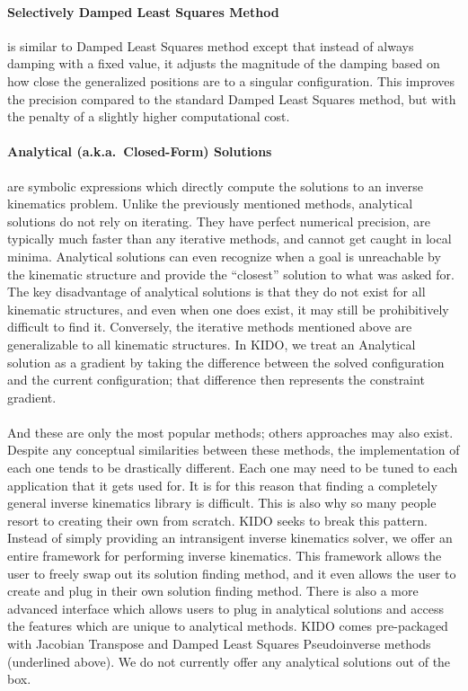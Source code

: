 \paragraph{Selectively Damped Least Squares Method\cite{Buss2005sdls}} is similar to Damped Least Squares method except that instead of always damping with a fixed value, it adjusts the magnitude of the damping based on how close the generalized positions are to a singular configuration. This improves the precision compared to the standard Damped Least Squares method, but with the penalty of a slightly higher computational cost.

\paragraph{Analytical (a.k.a.\ Closed-Form) Solutions} are symbolic expressions which directly compute the solutions to an inverse kinematics problem. Unlike the previously mentioned methods, analytical solutions do not rely on iterating. They have perfect numerical precision, are typically much faster than any iterative methods, and cannot get caught in local minima. Analytical solutions can even recognize when a goal is unreachable by the kinematic structure and provide the ``closest'' solution to what was asked for. The key disadvantage of analytical solutions is that they do not exist for all kinematic structures, and even when one does exist, it may still be prohibitively difficult to find it. Conversely, the iterative methods mentioned above are generalizable to all kinematic structures. In KIDO, we treat an Analytical solution as a gradient by taking the difference between the solved configuration and the current configuration; that difference then represents the constraint gradient.

\paragraph{} And these are only the most popular methods; others approaches may also exist. Despite any conceptual similarities between these methods, the implementation of each one tends to be drastically different. Each one may need to be tuned to each application that it gets used for. It is for this reason that finding a completely general inverse kinematics library is difficult. This is also why so many people resort to creating their own from scratch. KIDO seeks to break this pattern. Instead of simply providing an intransigent inverse kinematics solver, we offer an entire framework for performing inverse kinematics. This framework allows the user to freely swap out its solution finding method, and it even allows the user to create and plug in their own solution finding method. There is also a more advanced interface which allows users to plug in analytical solutions and access the features which are unique to analytical methods. KIDO comes pre-packaged with Jacobian Transpose and Damped Least Squares Pseudoinverse methods (underlined above). We do not currently offer any analytical solutions out of the box.

